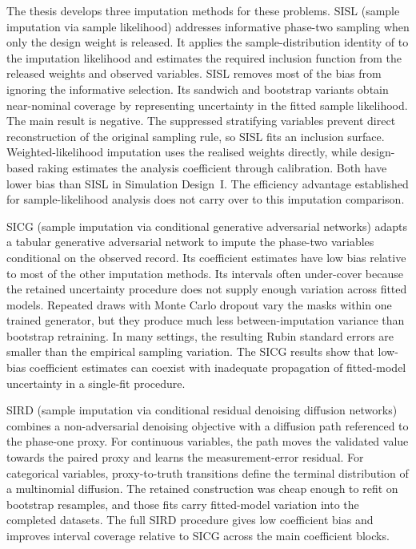 The thesis develops three imputation methods for these problems. SISL (sample imputation via sample likelihood) addresses informative phase-two sampling when only the design weight is released. It applies the sample-distribution identity of \citet{pfeffermann1999parametric} to the imputation likelihood and estimates the required inclusion function from the released weights and observed variables. SISL removes most of the bias from ignoring the informative selection. Its sandwich and bootstrap variants obtain near-nominal coverage by representing uncertainty in the fitted sample likelihood. The main result is negative. The suppressed stratifying variables prevent direct reconstruction of the original sampling rule, so SISL fits an inclusion surface. Weighted-likelihood imputation uses the realised weights directly, while design-based raking estimates the analysis coefficient through calibration. Both have lower bias than SISL in Simulation Design~I. The efficiency advantage established for sample-likelihood analysis does not carry over to this imputation comparison.

SICG (sample imputation via conditional generative adversarial networks) adapts a tabular generative adversarial network to impute the phase-two variables conditional on the observed record. Its coefficient estimates have low bias relative to most of the other imputation methods. Its intervals often under-cover because the retained uncertainty procedure does not supply enough variation across fitted models. Repeated draws with Monte Carlo dropout vary the masks within one trained generator, but they produce much less between-imputation variance than bootstrap retraining. In many settings, the resulting Rubin standard errors are smaller than the empirical sampling variation. The SICG results show that low-bias coefficient estimates can coexist with inadequate propagation of fitted-model uncertainty in a single-fit procedure.

SIRD (sample imputation via conditional residual denoising diffusion networks) combines a non-adversarial denoising objective with a diffusion path referenced to the phase-one proxy. For continuous variables, the path moves the validated value towards the paired proxy and learns the measurement-error residual. For categorical variables, proxy-to-truth transitions define the terminal distribution of a multinomial diffusion. The retained construction was cheap enough to refit on bootstrap resamples, and those fits carry fitted-model variation into the completed datasets. The full SIRD procedure gives low coefficient bias and improves interval coverage relative to SICG across the main coefficient blocks.

